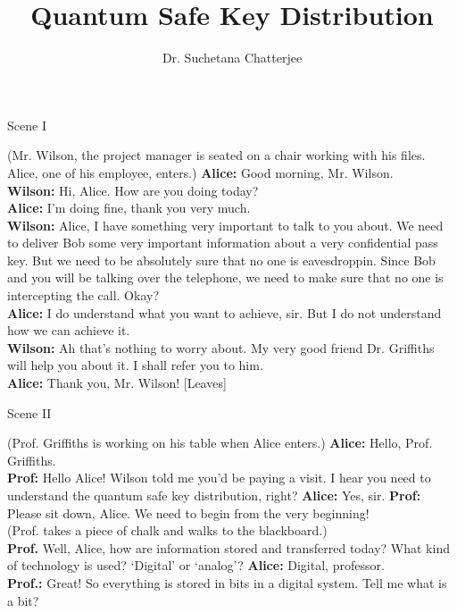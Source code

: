 \documentclass[12pt]{article}
\title{Quantum Safe Key Distribution}
\author{Dr. Suchetana Chatterjee}
\newcommand\tbf[1]{\textbf{#1}}
\newcommand\tp{\tbf{Prof.: }}
\begin{document}
\maketitle
\begin{enumerate}[1.]
\begin{center}
\large{Scene I}
\end{center}

{(Mr. Wilson, the project manager is seated on a chair working with his files. Alice, one of his employee, enters.)} \newline
\tbf{Alice:} Good morning, Mr. Wilson. \\ \newline
\tbf{Wilson:} Hi, Alice. How are you doing today? \\ \newline
\tbf{Alice:}	I'm doing fine, thank you very much. \\ \newline
\tbf{Wilson:} Alice, I have something very important to talk to you about. We need to deliver Bob some very important information about a very confidential pass key. But we need to be absolutely sure that no one is eavesdroppin. Since Bob and you will be talking over the telephone, we need to make sure that no one is intercepting the call. Okay? \\ \newline
\tbf{Alice:} I do understand what you want to achieve, sir. But I do not understand how we can achieve it. \\ \newline
\tbf{Wilson:} Ah that's nothing to worry about. My very good friend Dr. Griffiths will help you about it. I shall refer you to him. \\ \newline
\tbf{Alice:} Thank you, Mr. Wilson! [Leaves] \\ \newline
\newpage
\begin{center}
\large{Scene II}
\end{center}
(Prof. Griffiths is working on his table when Alice enters.)
\tbf{Alice:} Hello, Prof. Griffiths. \\ \newline
\tbf{Prof:} Hello Alice! Wilson told me you'd be paying a visit. I hear you need to understand the quantum safe key distribution, right? \newline
\tbf{Alice:} Yes, sir. \newline
\tbf{Prof:} Please sit down, Alice. We need to begin from the very beginning! \\ \newline
(Prof. takes a piece of chalk and walks to the blackboard.) \\ \newline
\tbf{Prof.} Well, Alice, how are information stored and transferred today? What kind of technology is used? `Digital' or `analog'? \newline
\tbf{Alice:} Digital, professor. \\ \newline
\tp Great! So everything is stored in bits in a digital system. Tell me what is a bit? \newline


\end{enumerate}
\end{document}
